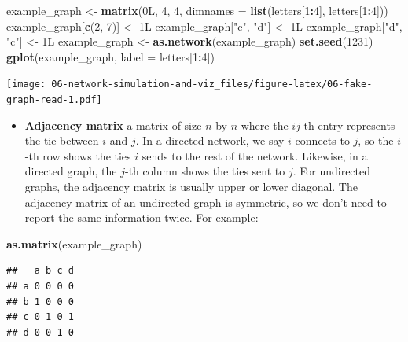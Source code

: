 \documentclass[]{book}
\newenvironment{Shaded}{\begin{snugshade}}{\end{snugshade}}
\newcommand{\DataTypeTok}[1]{\textcolor[rgb]{0.13,0.29,0.53}{#1}}
\newcommand{\DecValTok}[1]{\textcolor[rgb]{0.00,0.00,0.81}{#1}}
\newcommand{\KeywordTok}[1]{\textcolor[rgb]{0.13,0.29,0.53}{\textbf{#1}}}
\newcommand{\NormalTok}[1]{#1}
\newcommand{\OperatorTok}[1]{\textcolor[rgb]{0.81,0.36,0.00}{\textbf{#1}}}
\newcommand{\StringTok}[1]{\textcolor[rgb]{0.31,0.60,0.02}{#1}}
\providecommand{\tightlist}{%
  \setlength{\itemsep}{0pt}\setlength{\parskip}{0pt}}
\begin{document}
\begin{Shaded}
\begin{Highlighting}[]
\NormalTok{example_graph <-}\StringTok{ }\KeywordTok{matrix}\NormalTok{(0L, }\DecValTok{4}\NormalTok{, }\DecValTok{4}\NormalTok{, }\DataTypeTok{dimnames =} \KeywordTok{list}\NormalTok{(letters[}\DecValTok{1}\OperatorTok{:}\DecValTok{4}\NormalTok{], letters[}\DecValTok{1}\OperatorTok{:}\DecValTok{4}\NormalTok{]))}
\NormalTok{example_graph[}\KeywordTok{c}\NormalTok{(}\DecValTok{2}\NormalTok{, }\DecValTok{7}\NormalTok{)] <-}\StringTok{ }\NormalTok{1L}
\NormalTok{example_graph[}\StringTok{"c"}\NormalTok{, }\StringTok{"d"}\NormalTok{] <-}\StringTok{ }\NormalTok{1L}
\NormalTok{example_graph[}\StringTok{"d"}\NormalTok{, }\StringTok{"c"}\NormalTok{] <-}\StringTok{ }\NormalTok{1L}
\NormalTok{example_graph <-}\StringTok{ }\KeywordTok{as.network}\NormalTok{(example_graph)}
\KeywordTok{set.seed}\NormalTok{(}\DecValTok{1231}\NormalTok{)}
\KeywordTok{gplot}\NormalTok{(example_graph, }\DataTypeTok{label =}\NormalTok{ letters[}\DecValTok{1}\OperatorTok{:}\DecValTok{4}\NormalTok{])}
\end{Highlighting}
\end{Shaded}

\texttt{[image: 06-network-simulation-and-viz\_files/figure-latex/06-fake-graph-read-1.pdf]}

\begin{itemize}
\tightlist
\item
  \textbf{Adjacency matrix} a matrix of size \(n\) by \(n\) where the \(ij\)-th entry represents
  the tie between \(i\) and \(j\). In a directed network, we say \(i\) connects to \(j\),
  so the \(i\)-th row shows the ties \(i\) sends to the rest of the network. Likewise,
  in a directed graph, the \(j\)-th column shows the ties sent to \(j\). For undirected
  graphs, the adjacency matrix is usually upper or lower diagonal. The adjacency
  matrix of an undirected graph is symmetric, so we don't need to report the same
  information twice. For example:
\end{itemize}

\begin{Shaded}
\begin{Highlighting}[]
\KeywordTok{as.matrix}\NormalTok{(example_graph)}
\end{Highlighting}
\end{Shaded}

\begin{verbatim}
##   a b c d
## a 0 0 0 0
## b 1 0 0 0
## c 0 1 0 1
## d 0 0 1 0
\end{verbatim}
\end{document}
